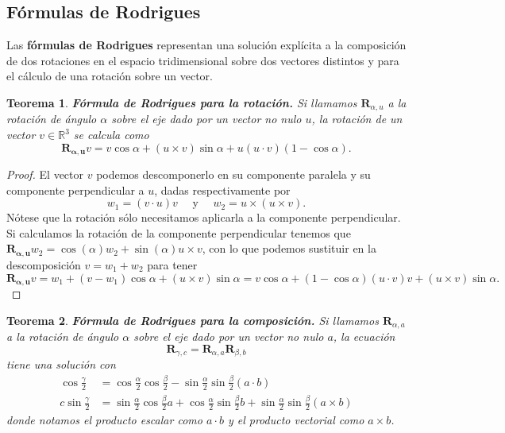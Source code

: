 \documentclass{article}
\theoremstyle{plain}
\newtheorem{theorem}{Teorema}
\theoremstyle{definition}
\theoremstyle{remark}
\begin{document}
\subsection{Fórmulas de Rodrigues}
Las \textbf{fórmulas de Rodrigues} representan una solución explícita
a la composición de dos rotaciones en el espacio tridimensional sobre
dos vectores distintos y para el cálculo de una rotación sobre un
vector.

\begin{theorem}
  \textbf{Fórmula de Rodrigues para la rotación.} Si llamamos
  $\mathbf{R}_{\alpha,u}$ a la rotación de ángulo $\alpha$ sobre el
  eje dado por un vector no nulo $u$, la rotación de un vector
  $v \in\mathbb{R}^3$ se calcula como
  \[\mathbf{R_{\alpha,u}}v = v \cos \alpha + (u \times v)\sin \alpha + u(u\cdot v)(1-\cos\alpha).\]
\end{theorem}
\begin{proof}
  El vector $v$ podemos descomponerlo en su componente paralela y su
  componente perpendicular a $u$, dadas respectivamente por
  \[w_1 = (v \cdot u) v \quad \text{ y } \quad w_2 = u \times (u \times v).\]
  Nótese que la rotación sólo necesitamos aplicarla a
  la componente perpendicular. Si calculamos la rotación de la
  componente perpendicular tenemos que
  $\mathbf{R_{\alpha,u}} w_2 = \cos(\alpha) w_2 + \sin(\alpha) u \times v$, con
  lo que podemos sustituir en la descomposición $v = w_1+w_2$ para
  tener
  \[\mathbf{R_{\alpha,u}}v =
    w_1 + (v-w_1)\cos\alpha + (u \times v)\sin\alpha =
    v\cos\alpha + (1-\cos \alpha)(u \cdot v)v + (u \times v)\sin\alpha.
  \]
\end{proof}

\begin{theorem}
  \textbf{Fórmula de Rodrigues para la composición.} Si llamamos
  $\mathbf{R}_{\alpha,a}$ a la rotación de ángulo $\alpha$ sobre el
  eje dado por un vector no nulo $a$, la ecuación
  \[\mathbf{R}_{\gamma,c} =\mathbf{R}_{\alpha,a}\mathbf{R}_{\beta,b}\]
  tiene una solución con
  \[\begin{aligned}
    \cos \frac{\gamma}{2} &=
    \cos \frac{\alpha}{2} \cos\frac{\beta}{2} - \sin\frac{\alpha}{2}\sin\frac{\beta}{2} (a\cdot b)\\
    c \sin \frac{\gamma}{2} &=
    \sin \frac{\alpha}{2} \cos\frac{\beta}{2} a +
    \cos \frac{\alpha}{2} \sin\frac{\beta}{2} b +
    \sin \frac{\alpha}{2} \sin\frac{\beta}{2} (a \times b)
  \end{aligned}\]
  donde notamos el producto escalar como $a\cdot b$ y el producto vectorial como $a \times b$.
  \cite{vince11}
\end{theorem}
\end{document}
